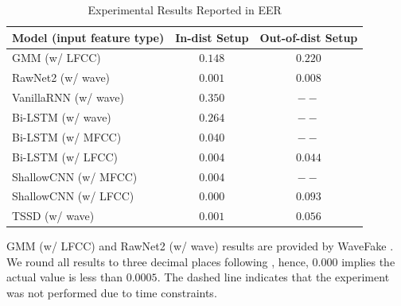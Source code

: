 \documentclass{article}
\begin{document}
\begin{table}[h!]
    \centering
    \caption{Experimental Results Reported in EER}
    \begin{tabular}{lcc}
        \toprule
        Model (input feature type)                               & In-dist Setup    & Out-of-dist Setup \\ \midrule
        \rule{0pt}{2.4ex} GMM (w/ LFCC) \cite{frank2021wavefake} & $0.148$          & $0.220$           \\
        \rule{0pt}{2.4ex} RawNet2 (w/ wave) \cite{RawNet2}       & $0.001$          & $\mathbf{0.008}$  \\ \midrule
        \rule{0pt}{2.4ex} VanillaRNN (w/ wave)                   & $0.350$          & $--$              \\
        \rule{0pt}{2.4ex} Bi-LSTM (w/ wave)                      & $0.264$          & $--$              \\
        \rule{0pt}{2.4ex} Bi-LSTM (w/ MFCC)                      & $0.040$          & $--$              \\
        \rule{0pt}{2.4ex} Bi-LSTM (w/ LFCC)                      & $0.004$          & $\mathbf{0.044}$  \\
        \rule{0pt}{2.4ex} ShallowCNN (w/ MFCC)                   & $0.004$          & $--$              \\
        \rule{0pt}{2.4ex} ShallowCNN (w/ LFCC)                   & $\mathbf{0.000}$ & $0.093$           \\
        \rule{0pt}{2.4ex} TSSD (w/ wave)                         & $0.001$          & $0.056$           \\
        \bottomrule
    \end{tabular}
    \begin{flushleft}
        \scriptsize{GMM (w/ LFCC) and RawNet2 (w/ wave) results are provided by WaveFake \cite{frank2021wavefake}. We round all results to three decimal places following \cite{frank2021wavefake}, hence, $0.000$ implies the actual value is less than $0.0005$. The dashed line indicates that the experiment was not performed due to time constraints.}
    \end{flushleft}
    \vspace{-1em}
    \label{tab:eer}
\end{table}
\end{document}
